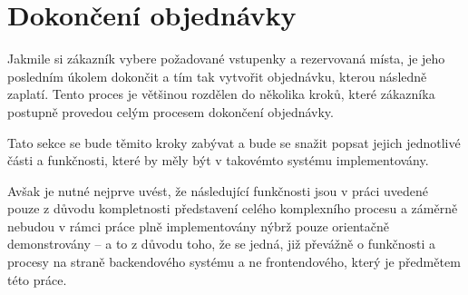 \section{Dokončení objednávky}
\label{sec:identifikace-dokonceni-objednavky}
Jakmile si zákazník vybere požadované vstupenky a rezervovaná místa, je jeho posledním úkolem dokončit a tím tak vytvořit objednávku, kterou následně zaplatí.
Tento proces je většinou rozdělen do několika kroků, které zákazníka postupně provedou celým procesem dokončení objednávky.

Tato sekce se bude těmito kroky zabývat a bude se snažit popsat jejich jednotlivé části a funkčnosti, které by měly být v takovémto systému implementovány.

Avšak je nutné nejprve uvést, že následující funkčnosti jsou v práci uvedené pouze z důvodu kompletnosti představení celého komplexního procesu a záměrně nebudou v rámci práce plně implementovány nýbrž pouze orientačně demonstrovány – a to z důvodu toho, že se jedná, již převážně o funkčnosti a procesy na straně backendového systému a ne frontendového, který je předmětem této práce.

